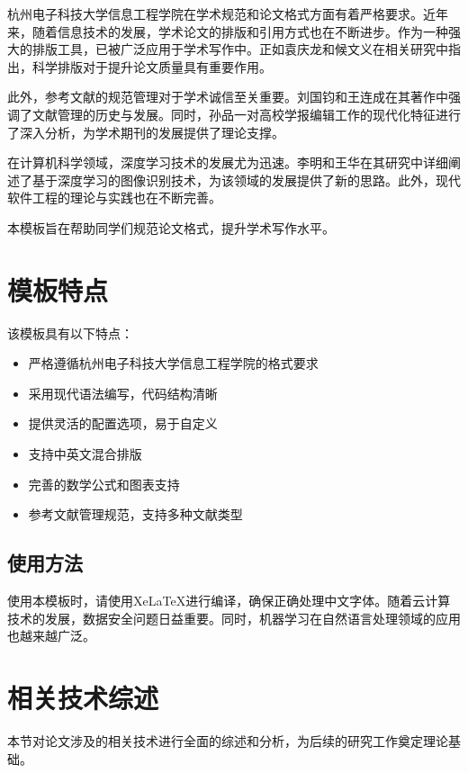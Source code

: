 \documentclass
  [
    math-font    = STIX Two Math, agreed,
    CJKmain-font = { {Songti SC}[AutoFakeBold = 2.5, AutoFakeSlant] },
    CJKsans-font = { {STHeiti}[AutoFakeBold = 2] }
  ] {hduthesis}
\begin{document}
杭州电子科技大学信息工程学院在学术规范和论文格式方面有着严格要求。近年来，随着信息技术的发展，学术论文的排版和引用方式也在不断进步。作为一种强大的排版工具，已被广泛应用于学术写作中。正如袁庆龙和候文义在相关研究中指出，科学排版对于提升论文质量具有重要作用\cite{ref1}。

此外，参考文献的规范管理对于学术诚信至关重要。刘国钧和王连成在其著作中强调了文献管理的历史与发展\cite{ref2}。同时，孙品一对高校学报编辑工作的现代化特征进行了深入分析\cite{ref3}，为学术期刊的发展提供了理论支撑。

在计算机科学领域，深度学习技术的发展尤为迅速。李明和王华在其研究中详细阐述了基于深度学习的图像识别技术\cite{ref5}，为该领域的发展提供了新的思路。此外，现代软件工程的理论与实践也在不断完善\cite{ref6}。

本模板旨在帮助同学们规范论文格式，提升学术写作水平。

\section{模板特点}

该模板具有以下特点：

\begin{itemize}
\item 严格遵循杭州电子科技大学信息工程学院的格式要求
\item 采用现代语法编写，代码结构清晰
\item 提供灵活的配置选项，易于自定义
\item 支持中英文混合排版
\item 完善的数学公式和图表支持
\item 参考文献管理规范，支持多种文献类型\cite{ref4}
\end{itemize}

\subsection{使用方法}

使用本模板时，请使用XeLaTeX进行编译，确保正确处理中文字体。随着云计算技术的发展，数据安全问题日益重要\cite{ref7}。同时，机器学习在自然语言处理领域的应用也越来越广泛\cite{ref8}。

\section{相关技术综述}

本节对论文涉及的相关技术进行全面的综述和分析，为后续的研究工作奠定理论基础。
\end{document}
